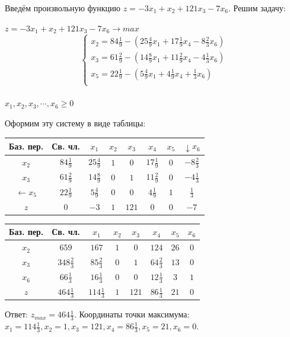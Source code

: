 \documentclass[a4paper,14pt]{extarticle}
\begin{document}
    Введём произвольную функцию $z = -3x_1 + x_2 + 121x_3 - 7x_6$. Решим задачу:
    \begin{center}
        $z = -3x_1 + x_2 + 121x_3 - 7x_6 \rightarrow max$\\
        \begin{equation*}
            \begin{cases}
                x_2 = 84\frac{1}{9} - (25\frac{4}{9}x_1 + 17\frac{1}{9}x_4 - 8\frac{2}{3}x_6) \\
                x_3 = 61\frac{2}{9} - (14\frac{8}{9}x_1 + 11\frac{2}{9}x_4 -4\frac{1}{3}x_6)  \\
                x_5 = 22\frac{1}{9} - (5\frac{4}{9}x_1 + 4\frac{1}{9}x_4 + \frac{1}{3}x_6)    \\
            \end{cases}
        \end{equation*}\\
        $x_1, x_2, x_3, \dotsb, x_6 \geq 0$
    \end{center}
    Оформим эту систему в виде таблицы:\\
    \begin{tabular}{|c|c|c|c|c|c|c|c|}
        \hline
        Баз. пер.        & Св. чл.         & $x_1$           & $x_2$ & $x_3$ & $x_4$           & $x_5$ & $\downarrow x_6$ \\
        \hline
        $x_2$            & $84\frac{1}{9}$ & $25\frac{4}{9}$ & $1$   & $0$   & $17\frac{1}{9}$ & $0$   & $- 8\frac{2}{3}$ \\
        \hline
        $x_3$            & $61\frac{2}{9}$ & $14\frac{8}{9}$ & $0$   & $1$   & $11\frac{2}{9}$ & $0$   & $-4\frac{1}{3}$  \\
        \hline
        $\leftarrow x_5$ & $22\frac{1}{9}$ & $5\frac{4}{9}$  & $0$   & $0$   & $4\frac{1}{9}$  & $1$   & $\frac{1}{3}$    \\
        \hline
        $z$              & $0$             & $-3$            & $1$   & $121$ & $0$             & $0$   & $-7$             \\
        \hline
    \end{tabular}\bigbreak
    \begin{tabular}{|c|c|c|c|c|c|c|c|}
        \hline
        Баз. пер. & Св. чл.          & $x_1$            & $x_2$ & $x_3$ & $x_4$           & $x_5$ & $x_6$ \\
        \hline
        $x_2$     & $659$            & $167$            & $1$   & $0$   & $124$           & $26$  & $0$   \\
        \hline
        $x_3$     & $348\frac{2}{3}$ & $85\frac{2}{3}$  & $0$   & $1$   & $64\frac{2}{3}$ & $13$  & $0$   \\
        \hline
        $x_6$     & $66\frac{1}{3}$  & $16\frac{1}{3}$  & $0$   & $0$   & $12\frac{1}{3}$ & $3$   & $1$   \\
        \hline
        $z$       & $464\frac{1}{3}$ & $114\frac{1}{3}$ & $1$   & $121$ & $86\frac{1}{3}$ & $21$  & $0$   \\
        \hline
    \end{tabular}\bigbreak
    Ответ: $z_{max} = 464\frac{1}{3}$. Координаты точки максимума: $x_1 = 114\frac{1}{3}, x_2 = 1, x_3 = 121, x_4 = 86\frac{1}{3}, x_5 = 21, x_6 = 0$.
\end{document}
